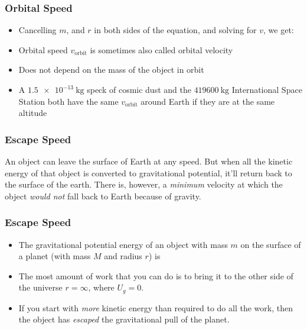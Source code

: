 \documentclass[12pt,compress,aspectratio=169]{beamer}
\begin{document}
\begin{frame}
  \frametitle{Orbital Speed}
  \begin{itemize}
  \item Cancelling $m$, and $r$ in both sides of the equation, and solving for
    $v$, we get:
    
  \item Orbital speed $v_\mathrm{orbit}$ is sometimes also called orbital
    velocity
  \item Does not depend on the mass of the object in orbit
  \item A $\SI{1.5e-13}{\kg}$ speck of cosmic dust and the $\SI{419600}{\kg}$
    International Space Station both have the same $v_\mathrm{orbit}$ around
    Earth if they are at the same altitude
  \end{itemize}
\end{frame}


\begin{frame}
  \frametitle{Escape Speed}
  An object can leave the surface of Earth at any speed. But when all the
  kinetic energy of that object is converted to gravitational potential, it'll
  return back to the surface of the earth. There is, however, a \emph{minimum}
  velocity at which the object \emph{would not} fall back to Earth because of
  gravity.
\end{frame}


\begin{frame}
  \frametitle{Escape Speed}
  \begin{itemize}
  \item The gravitational potential energy of an object with mass $m$ on the
    surface of a planet (with mass $M$ and radius $r$) is

  \item The most amount of work that you can do is to bring it to the other side
    of the universe $r=\infty$, where $U_g=0$.
  \item If you start with \emph{more} kinetic energy than required to do all
    the work, then the object has \emph{escaped} the gravitational pull of the
    planet.
  \end{itemize}
\end{frame}
\end{document}

